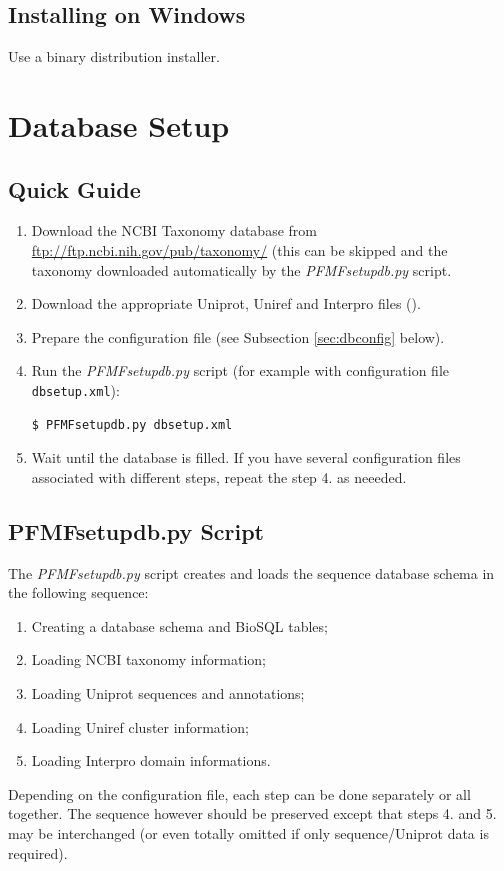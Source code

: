 \documentclass[11pt]{article}
\begin{document}
\subsection{Installing on Windows}

Use a binary distribution installer.

\section{Database Setup}

\subsection{Quick Guide}

\begin{enumerate}
\item Download the NCBI Taxonomy database from \url{ftp://ftp.ncbi.nih.gov/pub/taxonomy/} (this can be skipped and the taxonomy downloaded automatically by the {\it PFMFsetupdb.py} script.
\item Download the appropriate Uniprot, Uniref and Interpro files ().
\item Prepare the configuration file (see Subsection \ref{sec:dbconfig} below).
\item Run the {\it PFMFsetupdb.py} script (for example with configuration file {\tt dbsetup.xml}):
\begin{verbatim}
$ PFMFsetupdb.py dbsetup.xml
\end{verbatim}
\item Wait until the database is filled. If you have several configuration files associated with different steps, repeat the step 4. as neeeded.
\end{enumerate}

\subsection{PFMFsetupdb.py Script}

The {\it PFMFsetupdb.py} script creates and loads the sequence database schema in the following sequence:
\begin{enumerate}
\item Creating a database schema and BioSQL tables;
\item Loading NCBI taxonomy information;
\item Loading Uniprot sequences and annotations;
\item Loading Uniref cluster information;
\item Loading Interpro domain informations.
\end{enumerate}
Depending on the configuration file, each step can be done separately or all together. The sequence however should be preserved except that steps 4. and 5. may be interchanged (or even totally omitted if only sequence/Uniprot data is required).
\end{document}

